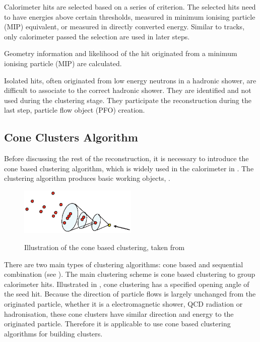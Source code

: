 Calorimeter hits are selected based on a series of criterion. The selected hits need to have energies above certain thresholds, measured in minimum ionising particle (MIP) equivalent, or measured in directly converted energy. Similar to tracks, only calorimeter passed the selection are used in later steps.

Geometry information and likelihood of the hit originated from a minimum ionising particle (MIP) are calculated.

Isolated hits, often originated from low energy neutrons in a hadronic shower, are difficult to associate to the correct hadronic shower. They are identified and not used during the clustering stage. They participate the reconstruction during the  last step, particle flow object (PFO) creation.

\subsection{Cone Clusters Algorithm}
\label{sec:pandoraConeCluster}
Before discussing the rest of the \pandora reconstruction, it is necessary to introduce the cone based clustering algorithm, which is widely used in the calorimeter in \pandora. The clustering algorithm produces basic working objects, \clusters.

\begin{figure}[tbph]
\centering
{\includegraphics[width=0.5\textwidth]{pandora/coneClustering}}%
\caption{Illustration of the cone based clustering, taken from \cite{Marshall:pandoraLC}}
\label{fig:pandoraConeClustering}
\end{figure}

There are two main types of clustering algorithms: cone based and sequential combination (see ). The main clustering scheme \pandora is cone based clustering to group calorimeter hits. Illustrated in , cone clustering has a specified opening angle of the seed hit. Because the direction of particle flows is largely unchanged from the originated particle, whether it is a electromagnetic shower, QCD radiation or hadronisation, these cone clusters have similar direction and energy to the originated particle. Therefore it is applicable to use cone based clustering algorithms for building clusters.


